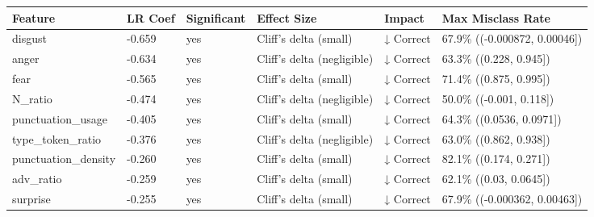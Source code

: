 \begin{tabular}{llllll}
\toprule
Feature & LR Coef & Significant & Effect Size & Impact & Max Misclass Rate \\
\midrule
disgust & -0.659 & yes & Cliff's delta (small) & ↓ Correct & 67.9\% ((-0.000872, 0.00046]) \\
anger & -0.634 & yes & Cliff's delta (negligible) & ↓ Correct & 63.3\% ((0.228, 0.945]) \\
fear & -0.565 & yes & Cliff's delta (small) & ↓ Correct & 71.4\% ((0.875, 0.995]) \\
N\_ratio & -0.474 & yes & Cliff's delta (negligible) & ↓ Correct & 50.0\% ((-0.001, 0.118]) \\
punctuation\_usage & -0.405 & yes & Cliff's delta (small) & ↓ Correct & 64.3\% ((0.0536, 0.0971]) \\
type\_token\_ratio & -0.376 & yes & Cliff's delta (negligible) & ↓ Correct & 63.0\% ((0.862, 0.938]) \\
punctuation\_density & -0.260 & yes & Cliff's delta (small) & ↓ Correct & 82.1\% ((0.174, 0.271]) \\
adv\_ratio & -0.259 & yes & Cliff's delta (small) & ↓ Correct & 62.1\% ((0.03, 0.0645]) \\
surprise & -0.255 & yes & Cliff's delta (small) & ↓ Correct & 67.9\% ((-0.000362, 0.00463]) \\
\bottomrule
\end{tabular}
